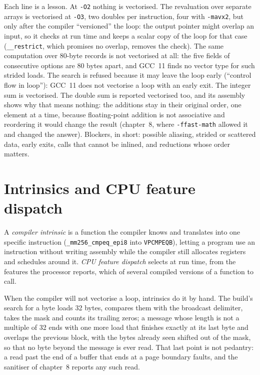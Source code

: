 Each line is a lesson. At \texttt{-O2} nothing is vectorised. The revaluation over separate arrays is vectorised at
\texttt{-O3}, two doubles per instruction, four with \texttt{-mavx2}, but only after the compiler ``versioned'' the loop:
the output pointer might overlap an input, so it checks at run time and keeps a scalar copy of the loop for that case
(\texttt{\_\_restrict}, which promises no overlap, removes the check). The same computation over 80-byte records is not
vectorised at all: the five fields of consecutive options are 80 bytes apart, and GCC~11 finds no vector type for such
strided loads. The search is refused because it may leave the loop early (``control flow in loop''): GCC~11 does not vectorise a loop
with an early exit. The integer sum is vectorised. The double sum is reported
vectorised too, and its assembly shows why that means nothing: the additions stay in their original order, one element at a
time, because floating-point addition is not associative and reordering it would change the result (chapter~8, where
\texttt{-ffast-math} allowed it and changed the answer). Blockers, in short: possible aliasing, strided or scattered data,
early exits, calls that cannot be inlined, and reductions whose order matters.

\section{Intrinsics and CPU feature dispatch}

\begin{definition}\label{def:ll:vector-instructions-and-data-parallel-code:intrinsic}
A \emph{compiler intrinsic} is a function the compiler knows and translates into one specific
instruction (\texttt{\_mm256\_cmpeq\_epi8} into \texttt{VPCMPEQB}), letting a program use an instruction without writing
assembly while the compiler still allocates registers and schedules around it. \emph{CPU feature
dispatch} selects at run time, from the features the processor reports, which of several
compiled versions of a function to call.
\end{definition}

When the compiler will not vectorise a loop, intrinsics do it by hand. The build's search for a byte loads 32 bytes, compares
them with the broadcast delimiter, takes the mask and counts its trailing zeros; a message whose length is not a multiple of
32 ends with one more load that finishes exactly at its last byte and overlaps the previous block, with the bytes already
seen shifted out of the mask, so that no byte beyond the message is ever read. That last point is not pedantry: a read past
the end of a buffer that ends at a page boundary faults, and the sanitiser of chapter~8 reports any such read.

